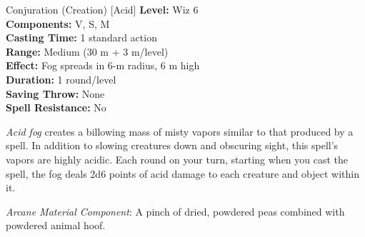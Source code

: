 {Conjuration (Creation) [Acid]}
{
	\textbf{Level:}
	Wiz 6\\
	\textbf{Components:}
	V, S, M\\
	\textbf{Casting Time:}
	1 standard action\\
	\textbf{Range:}
	Medium (30 m + 3 m/level)\\
	\textbf{Effect:}
	Fog spreads in 6-m radius, 6 m high\\
	\textbf{Duration:}
	1 round/level\\
	\textbf{Saving Throw:}
	None\\
	\textbf{Spell Resistance:}
	No\\
}
{
	\emph{Acid fog} creates a billowing mass of misty vapors similar to that produced by a  spell. In addition to slowing creatures down and obscuring sight, this spell's vapors are highly acidic. Each round on your turn, starting when you cast the spell, the fog deals 2d6 points of acid damage to each creature and object within it.

	\textit{Arcane Material Component}:
	A pinch of dried, powdered peas combined with powdered animal hoof.

}

